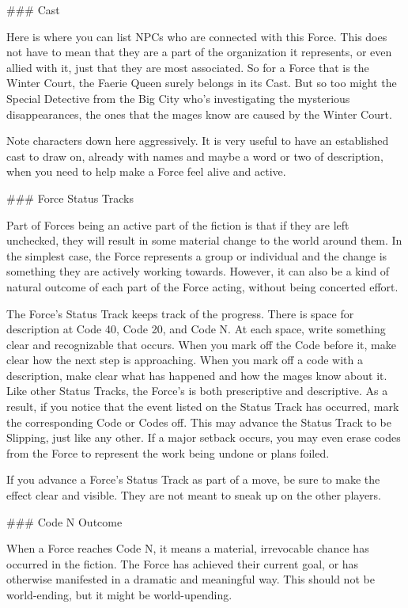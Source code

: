 \documentclass[
  oneside,
  statementpaper,
  9pt]{memoir}
\begin{document}
\begin{MC}
### Cast

Here is where you can list NPCs who are connected with this Force. This does not have to mean that they are a part of the organization it represents, or even allied with it, just that they are most associated. So for a Force that is the Winter Court, the Faerie Queen surely belongs in its Cast. But so too might the Special Detective from the Big City who’s investigating the mysterious disappearances, the ones that the mages know are caused by the Winter Court. 

Note characters down here aggressively. It is very useful to have an established cast to draw on, already with names and maybe a word or two of description, when you need to help make a Force feel alive and active.

### Force Status Tracks

Part of Forces being an active part of the fiction is that if they are left unchecked, they will result in some material change to the world around them. In the simplest case, the Force represents a group or individual and the change is something they are actively working towards. However, it can also be a kind of natural outcome of each part of the Force acting, without being concerted effort.

The Force’s Status Track keeps track of the progress. There is space for description at Code 40, Code 20, and Code N. At each space, write something clear and recognizable that occurs. When you mark off the Code before it, make clear how the next step is approaching. When you mark off a code with a description, make clear what has happened and how the mages know about it. Like other Status Tracks, the Force’s is both prescriptive and descriptive. As a result, if you notice that the event listed on the Status Track has occurred, mark the corresponding Code or Codes off. This may advance the Status Track to be Slipping, just like any other. If a major setback occurs, you may even erase codes from the Force to represent the work being undone or plans foiled.

If you advance a Force’s Status Track as part of a move, be sure to make the effect clear and visible. They are not meant to sneak up on the other players.

### Code N Outcome

When a Force reaches Code N, it means a material, irrevocable chance has occurred in the fiction. The Force has achieved their current goal, or has otherwise manifested in a dramatic and meaningful way. This should not be world-ending, but it might be world-upending.


\end{MC}
\end{document}
